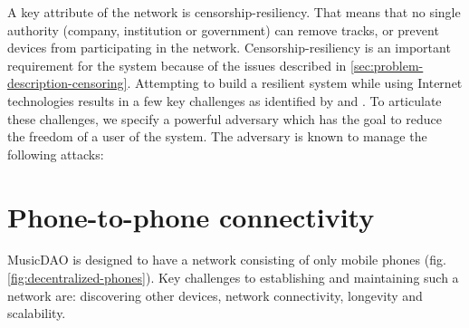 A key attribute of the network is censorship-resiliency. That means that no single authority (company, institution or government) can remove tracks, or prevent devices from participating in the network. Censorship-resiliency is an important requirement for the system because of the issues described in \ref{sec:problem-description-censoring}. Attempting to build a resilient system while using Internet technologies results in a few key challenges as identified by \cite{pouwelse2012censorship} and \cite{di2014bypassing}. To articulate these challenges, we specify a powerful adversary which has the goal to reduce the freedom of a user of the system. The adversary is known to manage the following attacks:

\section{Phone-to-phone connectivity}
MusicDAO is designed to have a network consisting of only mobile phones (fig. \ref{fig:decentralized-phones}). Key challenges to establishing and maintaining such a network are: discovering other devices, network connectivity, longevity and scalability.

